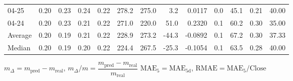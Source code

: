 \begin{threeparttable}
{\begin{tabular}{lrrrrrrrrrrrr}
  04-25 &          0.20 &          0.23 &          0.24 &        0.22 &               278.2 &               275.0 &        3.2 &       0.0117 &                 0.0 &             45.1 &            0.21 &                  40.00 \\
  04-24 &          0.20 &          0.23 &          0.21 &        0.22 &               271.0 &               220.0 &       51.0 &       0.2320 &                 0.1 &             60.2 &            0.30 &                  35.00 \\
Average &          0.20 &          0.19 &          0.21 &        0.22 &               228.9 &               273.2 &      -44.3 &      -0.0892 &                 0.1 &             67.2 &            0.30 &                  37.33 \\
 Median &          0.20 &          0.19 &          0.20 &        0.22 &               224.4 &               267.5 &      -25.3 &      -0.1054 &                 0.1 &             63.5 &            0.28 &                  40.00 \\
\bottomrule
\end{tabular}
}
\begin{tablenotes}\footnotesize
\item $m_\Delta=m_{\text{pred}}-m_{\text{real}}$,
$m_\Delta/m=\dfrac{m_{\text{pred}}-m_{\text{real}}}{m_{\text{real}}}$
$\mathrm{MAE}_5=\mathrm{MAE}_{5\text{d}}$,
$\mathrm{RMAE}=\mathrm{MAE}_5/\text{Close}$
\end{tablenotes}
\end{threeparttable}
\endgroup

